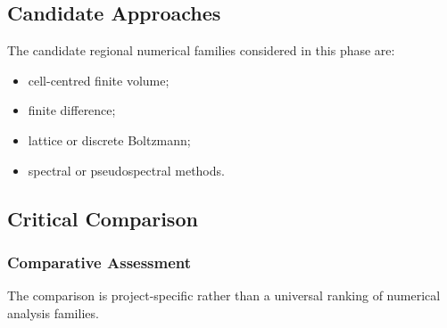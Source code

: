 
\subsection{Candidate Approaches}
\label{sec:res-num-frm-candidate-approaches}

The candidate regional numerical families considered in this phase are:

\begin{itemize}
  \item cell-centred finite volume;
  \item finite difference;
  \item lattice or discrete Boltzmann;
  \item spectral or pseudospectral methods.
\end{itemize}

\subsection{Critical Comparison}
\label{sec:res-num-frm-critical-comparison}


\subsubsection{Comparative Assessment}
\label{sec:res-num-frm-comparative-assessment}

The comparison is project-specific rather than a universal ranking of
numerical analysis families.

